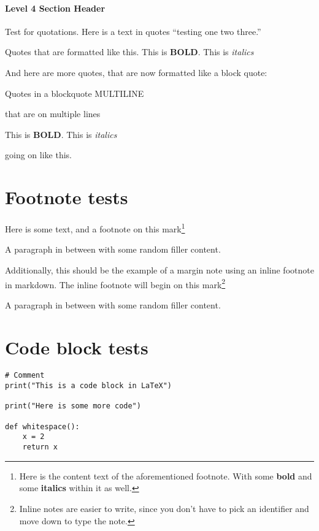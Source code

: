 \paragraph{Level 4 Section Header}

Test for quotations. Here is a text in quotes \enquote{testing one two
three.}

\begin{displayquote}
Quotes that are formatted like this. This is \textbf{BOLD}. This is
\emph{italics}
\end{displayquote}

And here are more quotes, that are now formatted like a block quote:

\begin{displayquote}
Quotes in a blockquote MULTILINE

that are on multiple lines

This is \textbf{BOLD}. This is \emph{italics}

going on like this.
\end{displayquote}

\section{Footnote tests}

Here is some text, and a footnote on this mark\footnote{Here is the
  content text of the aforementioned footnote. With some \textbf{bold}
  and some \textbf{italics} within it as well.}

A paragraph in between with some random filler content.

Additionally, this should be the example of a margin note using an
inline footnote in markdown. The inline footnote will begin on this
mark\footnote{Inline notes are easier to write, since you don't have to
  pick an identifier and move down to type the note.}

A paragraph in between with some random filler content.

\section{Code block tests}

\begin{listing}[h]
\begin{verbatim}
# Comment
print("This is a code block in LaTeX")

print("Here is some more code")

def whitespace():
    x = 2
    return x
\end{verbatim}
\end{listing}